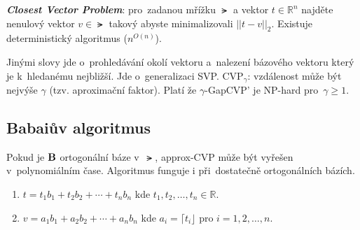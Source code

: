 \textbf{\emph{Closest Vector Problem}}: pro~zadanou mřížku $\lat$ a vektor $t \in \mathbb{R}^n$ najděte nenulový vektor $v \in \lat$ takový abyste minimalizovali $||t - v||_2$.
Existuje deterministický algoritmus ($n^{O(n)}$)\footnotemark{}.

Jinými slovy jde o~prohledávání okolí vektoru a~nalezení bázového vektoru který je k~hledanému nejbližší.
Jde o~generalizaci SVP.
CVP$_\gamma$: vzdálenost může být nejvýše $\gamma$ (tzv. aproximační faktor).
Platí že $\gamma$-GapCVP' je NP-hard pro~$\gamma \ge 1$\footnotemark{}.


\subsection{Babaiův algoritmus}

Pokud je $\text{\textbf{B}}$ ortogonální báze v~$\lat$, approx-CVP může být vyřešen v~polynomiálním čase.
Algoritmus funguje i při~dostatečně ortogonálních bázích.

\begin{enumerate}
\item $t = t_1 b_1 + t_2 b_2 + \cdots + t_n b_n$ kde $t_1, t_2, \dots, t_n \in \mathbb{R}$.
\item $v = a_1 b_1 + a_2 b_2 + \cdots + a_n b_n$ kde $a_i = \lceil t_i \rfloor$ pro $i = 1, 2, \dots, n$.
\end{enumerate}


